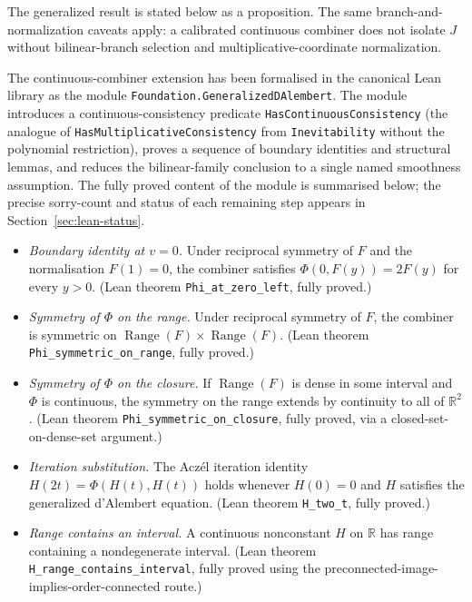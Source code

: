 \documentclass[11pt,a4paper]{article}
\theoremstyle{definition}
\theoremstyle{remark}
\begin{document}
The generalized result is stated below as a proposition. The same
branch-and-normalization caveats apply: a calibrated continuous
combiner does not isolate $J$ without bilinear-branch selection and
multiplicative-coordinate normalization.

The continuous-combiner extension has been formalised in the canonical
Lean library as the module
\texttt{Foundation.GeneralizedDAlembert}. The module
introduces a continuous-consistency predicate
\texttt{HasContinuousConsistency} (the analogue of
\texttt{HasMultiplicativeConsistency} from \texttt{Inevitability}
without the polynomial restriction), proves a sequence of boundary
identities and structural lemmas, and reduces the bilinear-family
conclusion to a single named smoothness assumption. The fully proved
content of the module is summarised below; the precise sorry-count and
status of each remaining step appears in
Section~\ref{sec:lean-status}.

\begin{itemize}[leftmargin=*]
\item \emph{Boundary identity at $v = 0$.} Under reciprocal symmetry of
$F$ and the normalisation $F(1) = 0$, the combiner satisfies $\Phi(0,
F(y)) = 2 F(y)$ for every $y > 0$. (Lean theorem
\texttt{Phi\_at\_zero\_left}, fully proved.)
\item \emph{Symmetry of $\Phi$ on the range.} Under reciprocal symmetry
of $F$, the combiner is symmetric on
$\operatorname{Range}(F) \times \operatorname{Range}(F)$. (Lean
theorem \texttt{Phi\_symmetric\_on\_range}, fully proved.)
\item \emph{Symmetry of $\Phi$ on the closure.} If
$\operatorname{Range}(F)$ is dense in some interval and $\Phi$ is
continuous, the symmetry on the range extends by continuity to all of
$\mathbb{R}^2$. (Lean theorem \texttt{Phi\_symmetric\_on\_closure},
fully proved, via a closed-set-on-dense-set argument.)
\item \emph{Iteration substitution.} The Acz\'el iteration identity
$H(2t) = \Phi(H(t), H(t))$ holds whenever $H(0) = 0$ and $H$ satisfies
the generalized d'Alembert equation. (Lean theorem \texttt{H\_two\_t},
fully proved.)
\item \emph{Range contains an interval.} A continuous nonconstant $H$
on $\mathbb{R}$ has range containing a nondegenerate interval. (Lean
theorem \texttt{H\_range\_contains\_interval}, fully proved using the
preconnected-image-implies-order-connected route.)
\end{itemize}
\end{document}
